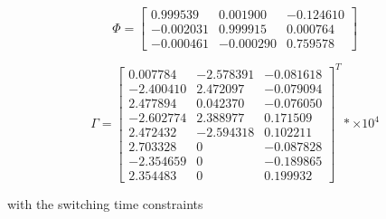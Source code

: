 \begin{equation}
    \Phi =
    \left[
    \begin{matrix}
       0.999539  &   0.001900 & -0.124610 \\
      -0.002031  &   0.999915 &  0.000764 \\
      -0.000461  &  -0.000290 &  0.759578
    \end{matrix}
    \right]
\end{equation}

\begin{equation}
    \Gamma =
    \left[
    \begin{matrix}
         0.007784  &  -2.578391  &  -0.081618 \\
        -2.400410  &   2.472097  &  -0.079094 \\
         2.477894  &   0.042370  &  -0.076050 \\
        -2.602774  &   2.388977  &   0.171509 \\
         2.472432  &  -2.594318  &   0.102211 \\
         2.703328  &       0     &  -0.087828 \\
        -2.354659  &       0     &  -0.189865 \\
         2.354483  &       0     &   0.199932
    \end{matrix}
    \right]^T
    * \times 10^4
\end{equation}

\noindent
with the switching time constraints

